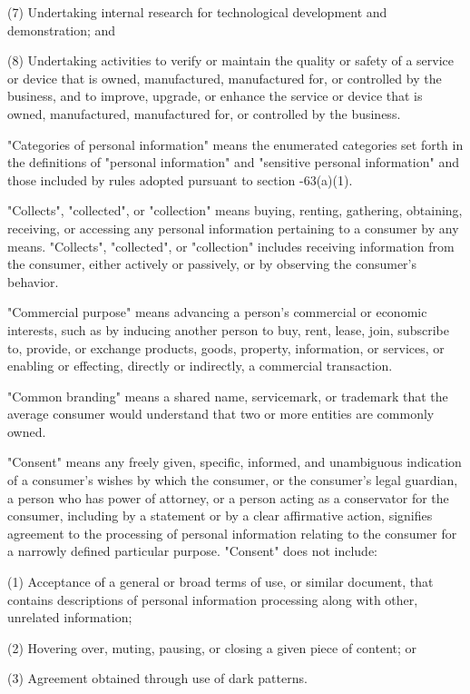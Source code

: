      (7)  Undertaking internal research for technological development and demonstration; and

     (8)  Undertaking activities to verify or maintain the quality or safety of a service or device that is owned, manufactured, manufactured for, or controlled by the business, and to improve, upgrade, or enhance the service or device that is owned, manufactured, manufactured for, or controlled by the business.

     "Categories of personal information" means the enumerated categories set forth in the definitions of "personal information" and "sensitive personal information" and those included by rules adopted pursuant to section    -63(a)(1).

     "Collects", "collected", or "collection" means buying, renting, gathering, obtaining, receiving, or accessing any personal information pertaining to a consumer by any means.  "Collects", "collected", or "collection" includes receiving information from the consumer, either actively or passively, or by observing the consumer's behavior.

     "Commercial purpose" means advancing a person's commercial or economic interests, such as by inducing another person to buy, rent, lease, join, subscribe to, provide, or exchange products, goods, property, information, or services, or enabling or effecting, directly or indirectly, a commercial transaction.

     "Common branding" means a shared name, servicemark, or trademark that the average consumer would understand that two or more entities are commonly owned.

     "Consent" means any freely given, specific, informed, and unambiguous indication of a consumer's wishes by which the consumer, or the consumer's legal guardian, a person who has power of attorney, or a person acting as a conservator for the consumer, including by a statement or by a clear affirmative action, signifies agreement to the processing of personal information relating to the consumer for a narrowly defined particular purpose.  "Consent" does not include:

     (1)  Acceptance of a general or broad terms of use, or similar document, that contains descriptions of personal information processing along with other, unrelated information;

     (2)  Hovering over, muting, pausing, or closing a given piece of content; or

     (3)  Agreement obtained through use of dark patterns.

